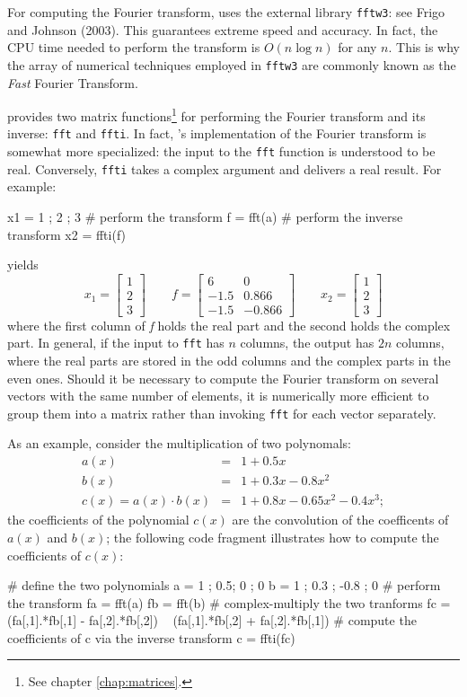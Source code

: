 For computing the Fourier transform,  uses the external
library \texttt{fftw3}: see Frigo and Johnson (2003). This guarantees
extreme speed and accuracy. In fact, the CPU time needed to perform
the transform is $O(n \log n)$ for any $n$. This is why the array of
numerical techniques employed in \texttt{fftw3} are commonly known as
the \emph{Fast} Fourier Transform.

 provides two matrix functions\footnote{See chapter
  \ref{chap:matrices}.} for performing the Fourier transform and its
inverse: \texttt{fft} and \texttt{ffti}. In fact, 's
implementation of the Fourier transform is somewhat more specialized:
the input to the \texttt{fft} function is understood to be real.
Conversely, \texttt{ffti} takes a complex argument and delivers a real
result. For example:
\begin{code}
x1 = { 1 ; 2 ; 3 }
# perform the transform
f = fft(a)
# perform the inverse transform
x2 = ffti(f)
\end{code}
yields
\[
  x_1 = \left[ \begin{array}{c} 1 \\ 2 \\ 3 \end{array} \right] 
  \qquad
  f = \left[ \begin{array}{rr} 
      6 & 0 \\ -1.5 & 0.866 \\ -1.5 & -0.866 
   \end{array} \right] 
  \qquad
  x_2 = \left[ \begin{array}{c} 1 \\ 2 \\ 3 \end{array} \right] 
\]
where the first column of \emph{f} holds the real part and the second
holds the complex part. In general, if the input to \texttt{fft} has
$n$ columns, the output has $2n$ columns, where the real parts are
stored in the odd columns and the complex parts in the even
ones. Should it be necessary to compute the Fourier transform on
several vectors with the same number of elements, it is numerically more
efficient to group them into a matrix rather than invoking
\texttt{fft} for each vector separately.

As an example, consider the multiplication of two polynomals:
\begin{eqnarray*}
  a(x) & = & 1 + 0.5 x \\
  b(x) & = & 1 + 0.3 x - 0.8 x^2 \\
  c(x) = a(x) \cdot b(x) & = & 1 + 0.8 x - 0.65 x^2 - 0.4 x^3 ;
\end{eqnarray*}
the coefficients of the polynomial $c(x)$ are the convolution of the
coefficents of $a(x)$ and $b(x)$; the following  code fragment
illustrates how to compute the coefficients of $c(x)$:
\begin{code}
# define the two polynomials
a = { 1 ; 0.5; 0 ; 0 }
b = { 1 ; 0.3 ; -0.8 ; 0 }
# perform the transform
fa = fft(a)
fb = fft(b)
# complex-multiply the two tranforms 
fc = (fa[,1].*fb[,1] - fa[,2].*fb[,2]) ~ (fa[,1].*fb[,2] + fa[,2].*fb[,1])  
# compute the coefficients of c via the inverse transform
c = ffti(fc)
\end{code}

